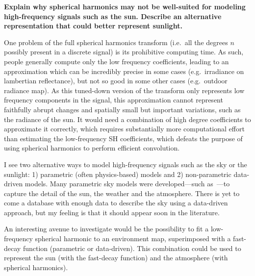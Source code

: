 \documentclass{report}
\begin{document}
\textbf{Explain why spherical harmonics may not be well-suited for modeling high-frequency signals such as the sun. Describe an alternative representation that could better represent sunlight.}

One problem of the full spherical harmonics transform (i.e.\ all the degrees $n$ possibly present in a discrete signal) is its prohibitive computing time. As such, people generally compute only the low frequency coefficients, leading to an approximation which can be incredibly precise in some cases (e.g.\ irradiance on lambertian reflectance), but not so good in some other cases (e.g.\ outdoor radiance map). As this tuned-down version of the transform only represents low frequency components in the signal, this approximation cannot represent faithfully abrupt changes and spatially small but important variations, such as the radiance of the sun. It would need a combination of high degree coefficients to approximate it correctly, which requires substantially more computational effort than estimating the low-frequency SH coefficients, which defeats the purpose of using spherical harmonics to perform efficient convolution.

I see two alternative ways to model high-frequency signals such as the sky or the sunlight: 1) parametric (often physics-based) models and 2) non-parametric data-driven models. Many parametric sky models were developed---such as~\cite{preetham-siggraph-99,perez-se-93}---to capture the detail of the sun, the weather and the atmosphere. There is yet to come a database with enough data to describe the sky using a data-driven approach, but my feeling is that it should appear soon in the literature.

An interesting avenue to investigate would be the possibility to fit a low-frequency spherical harmonic to an environment map, superimposed with a fast-decay function (parametric or data-driven). This combination could be used to represent the sun (with the fast-decay function) and the atmosphere (with spherical harmonics).


{\small


}
\end{document}
